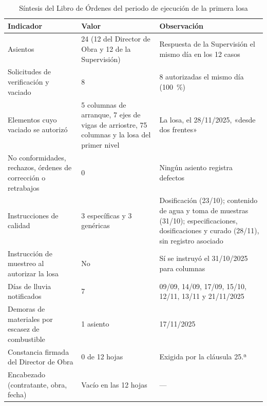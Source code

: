 \begin{table}[H]
\caption{Síntesis del Libro de Órdenes del periodo de ejecución de la primera losa}
\label{tab:libro-ordenes}
\setlength{\tabcolsep}{4pt}
\begin{tabularx}{\linewidth}{@{}P{5.4cm}P{2.8cm}L@{}}
\toprule
\textbf{Indicador} & \textbf{Valor} & \textbf{Observación} \\
\midrule
Asientos & 24 (12 del Director de Obra y 12 de la Supervisión) & Respuesta de la Supervisión el mismo día en los 12 casos \\
Solicitudes de verificación y vaciado & 8 & 8 autorizadas el mismo día (100~\%) \\
Elementos cuyo vaciado se autorizó & 5 columnas de arranque, 7 ejes de vigas de arriostre, 75 columnas y la losa del primer nivel & La losa, el 28/11/2025, «desde dos frentes» \\
No conformidades, rechazos, órdenes de corrección o retrabajos & 0 & Ningún asiento registra defectos \\
Instrucciones de calidad & 3 específicas y 3 genéricas & Dosificación (23/10); contenido de agua y toma de muestras (31/10); especificaciones, dosificaciones y curado (28/11), sin registro asociado \\
Instrucción de muestreo al autorizar la losa & No & Sí se instruyó el 31/10/2025 para columnas \\
Días de lluvia notificados & 7 & 09/09, 14/09, 17/09, 15/10, 12/11, 13/11 y 21/11/2025 \\
Demoras de materiales por escasez de combustible & 1 asiento & 17/11/2025 \\
Constancia firmada del Director de Obra & 0 de 12 hojas & Exigida por la cláusula 25.ª \\
Encabezado (contratante, obra, fecha) & Vacío en las 12 hojas & --- \\
\bottomrule
\end{tabularx}
\end{table}

